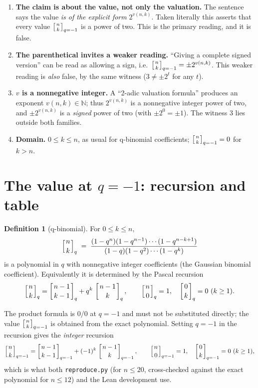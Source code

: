 \documentclass[11pt]{article}
\theoremstyle{definition}
\newtheorem{definition}[theorem]{Definition}
\theoremstyle{remark}
\newcommand{\N}{\mathbb{N}}
\newcommand{\qbin}[2]{\left[\genfrac{}{}{0pt}{}{#1}{#2}\right]_{q}}
\newcommand{\qbinm}[2]{\left[\genfrac{}{}{0pt}{}{#1}{#2}\right]_{q=-1}}
\begin{document}
\begin{enumerate}
\item \textbf{The claim is about the value, not only the valuation.} The
  sentence says the value \emph{is of the explicit form} $2^{v(n,k)}$. Taken
  literally this asserts that every value $\qbinm{n}{k}$ is a power of two.
  This is the primary reading, and it is false.
\item \textbf{The parenthetical invites a weaker reading.} ``Giving a complete
  signed version'' can be read as allowing a sign, i.e.\
  $\qbinm{n}{k} = \pm 2^{v(n,k)}$. This weaker reading is \emph{also} false,
  by the same witness ($3 \neq \pm 2^{t}$ for any $t$).
\item \textbf{$v$ is a nonnegative integer.} A ``2-adic valuation formula''
  produces an exponent $v(n,k) \in \N$; thus $2^{v(n,k)}$ is a nonnegative
  integer power of two, and $\pm 2^{v(n,k)}$ is a \emph{signed} power of two
  (with $\pm 2^0 = \pm 1$). The witness $3$ lies outside both families.
\item \textbf{Domain.} $0 \le k \le n$, as usual for q-binomial coefficients;
  $\qbinm{n}{k}=0$ for $k>n$.
\end{enumerate}

\section{The value at $q=-1$: recursion and table}

\begin{definition}[q-binomial]
For $0 \le k \le n$,
\[
\qbin{n}{k} \;=\; \frac{(1-q^{n})(1-q^{n-1})\cdots(1-q^{n-k+1})}
                     {(1-q)(1-q^{2})\cdots(1-q^{k})}
\]
is a polynomial in $q$ with nonnegative integer coefficients (the Gaussian
binomial coefficient). Equivalently it is determined by the Pascal recursion
\[
\qbin{n}{k} = \qbin{n-1}{k-1} + q^{k}\,\qbin{n-1}{k},
\qquad \qbin{n}{0}=1,\quad \qbin{0}{k}=0 \ (k\ge 1).
\]
\end{definition}

The product formula is $0/0$ at $q=-1$ and must not be substituted directly;
the value $\qbinm{n}{k}$ is obtained from the exact polynomial. Setting
$q=-1$ in the recursion gives the \emph{integer} recursion
\begin{equation}\label{eq:rec}
\qbinm{n}{k} = \qbinm{n-1}{k-1} + (-1)^{k}\,\qbinm{n-1}{k},
\qquad \qbinm{n}{0}=1,\quad \qbinm{0}{k}=0 \ (k\ge 1),
\end{equation}
which is what both \texttt{reproduce.py} (for $n \le 20$, cross-checked against
the exact polynomial for $n \le 12$) and the Lean development use.
\end{document}
